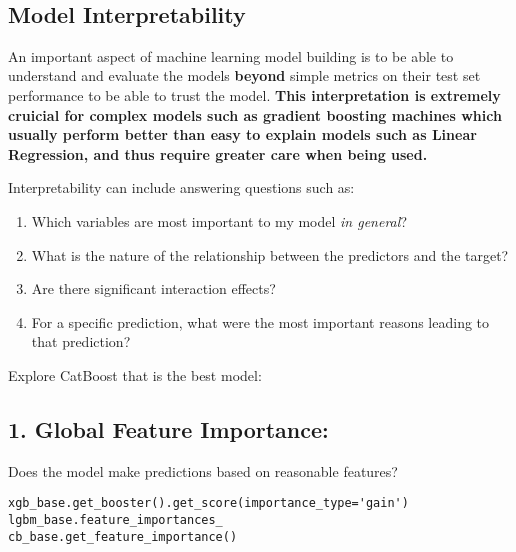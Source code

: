 \documentclass[11pt]{article}
\providecommand{\tightlist}{%
      \setlength{\itemsep}{0pt}\setlength{\parskip}{0pt}}
\begin{document}
    \begin{center}
    \end{center}
    { \hspace*{\fill} \\}
    
    \hypertarget{model-interpretability}{%
\subsection{Model Interpretability}\label{model-interpretability}}

An important aspect of machine learning model building is to be able to
understand and evaluate the models \textbf{beyond} simple metrics on
their test set performance to be able to trust the model. \textbf{This
interpretation is extremely cruicial for complex models such as gradient
boosting machines which usually perform better than easy to explain
models such as Linear Regression, and thus require greater care when
being used.}

Interpretability can include answering questions such as:

\begin{enumerate}
\def\labelenumi{\arabic{enumi}.}
\tightlist
\item
  Which variables are most important to my model \emph{in general}?
\item
  What is the nature of the relationship between the predictors and the
  target?
\item
  Are there significant interaction effects?
\item
  For a specific prediction, what were the most important reasons
  leading to that prediction?
\end{enumerate}

Explore CatBoost that is the best model:

    \hypertarget{global-feature-importance}{%
\subsection{1. Global Feature
Importance:}\label{global-feature-importance}}

Does the model make predictions based on reasonable features?

\begin{verbatim}
xgb_base.get_booster().get_score(importance_type='gain')
lgbm_base.feature_importances_
cb_base.get_feature_importance()
\end{verbatim}
\end{document}
